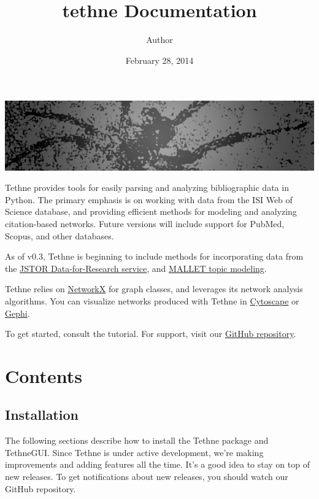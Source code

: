 \documentclass[letterpaper,10pt,english]{sphinxmanual}
\title{tethne Documentation}
\date{February 28, 2014}
\author{Author}
\begin{document}
\maketitle
\tableofcontents
{}\label{index::doc}


\includegraphics[width=1.000\linewidth]{logo.jpeg}

Tethne provides tools for easily parsing and analyzing bibliographic data in Python.
The primary emphasis is on working with data from the ISI Web of Science database, and
providing efficient methods for modeling and analyzing citation-based networks. Future
versions will include support for PubMed, Scopus, and other databases.

As of v0.3, Tethne is beginning to include methods for incorporating data from the \href{http://dfr.jstor.org}{JSTOR
Data-for-Research service}, and \href{http://mallet.cs.umass.edu/topics.php}{MALLET topic modeling}.

Tethne relies on \href{http://networkx.github.io/}{NetworkX} for graph classes, and leverages its network
analysis algorithms. You can visualize networks produced with Tethne in \href{http://www.cytoscape.org/}{Cytoscape} or \href{https://gephi.org/}{Gephi}.

To get started, consult the tutorial. For support, visit our \href{https://github.com/diging/tethne/issues}{GitHub
repository}.


\chapter{Contents}
\label{index:tethne-bibliographic-network-analysis-in-python}\label{index:contents}\label{index:repository}

\section{Installation}
\label{install:installation}\label{install::doc}\label{install:id1}
The following sections describe how to install the Tethne package and TethneGUI. Since
Tethne is under active development, we're making improvements and adding features all the
time. It's a good idea to stay on top of new releases. To get notifications about new
releases, you should watch our GitHub repository.
\end{document}
